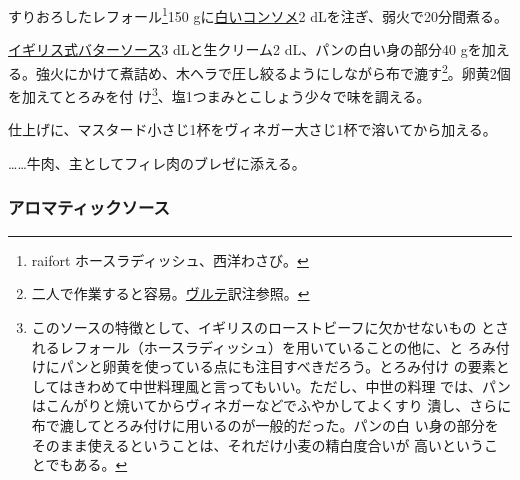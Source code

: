 \begin{recette}


すりおろしたレフォール\footnote{raifort ホースラディッシュ、西洋わさび。}150
gに\protect\hyperlink{}{白いコンソメ}2 dLを注ぎ、弱火で20分間煮る。

\protect\hyperlink{butter-sauce}{イギリス式バターソース}3
dLと生クリーム2\undemi{} dL、パンの白い身の部分40
gを加える。強火にかけて煮詰め、木ヘラで圧し絞るようにしながら布で漉す\footnote{二人で作業すると容易。\protect\hyperlink{veloute}{ヴルテ}訳注参照。}。卵黄2個を加えてとろみを付
け\footnote{このソースの特徴として、イギリスのローストビーフに欠かせないもの
  とされるレフォール（ホースラディッシュ）を用いていることの他に、と
  ろみ付けにパンと卵黄を使っている点にも注目すべきだろう。とろみ付け
  の要素としてはきわめて中世料理風と言ってもいい。ただし、中世の料理
  では、パンはこんがりと焼いてからヴィネガーなどでふやかしてよくすり
  潰し、さらに布で漉してとろみ付けに用いるのが一般的だった。パンの白
  い身の部分をそのまま使えるということは、それだけ小麦の精白度合いが
  高いということでもある。}、塩1つまみとこしょう少々で味を調える。

仕上げに、マスタード小さじ1杯をヴィネガー大さじ1杯で溶いてから加える。

\ldots{}\ldots{}牛肉、主としてフィレ肉のブレゼに添える。

\maeaki

\hypertarget{aromatic-sauce}{%
\subsubsection{アロマティックソース}\label{aromatic-sauce}}




\end{recette}
